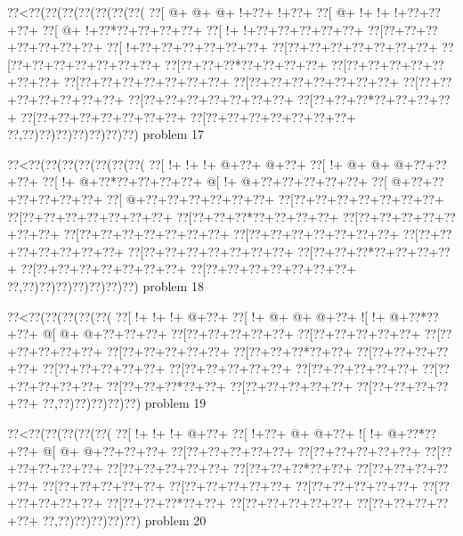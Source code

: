 \vbox{\vbox{\goo
\0??<\0??(\0??(\0??(\0??(\0??(\0??(\0??(
\0??[\- @+\- @+\- @+\- !+\0??+\- !+\0??+
\0??[\- @+\- !+\- !+\- !+\0??+\0??+\0??+
\0??[\- @+\- !+\0??*\0??+\0??+\0??+\0??+
\0??[\- !+\- !+\0??+\0??+\0??+\0??+\0??+
\0??[\0??+\0??+\0??+\0??+\0??+\0??+\0??+
\0??[\- !+\0??+\0??+\0??+\0??+\0??+\0??+
\0??[\0??+\0??+\0??+\0??+\0??+\0??+\0??+
\0??[\0??+\0??+\0??+\0??+\0??+\0??+\0??+
\0??[\0??+\0??+\0??*\0??+\0??+\0??+\0??+
\0??[\0??+\0??+\0??+\0??+\0??+\0??+\0??+
\0??[\0??+\0??+\0??+\0??+\0??+\0??+\0??+
\0??[\0??+\0??+\0??+\0??+\0??+\0??+\0??+
\0??[\0??+\0??+\0??+\0??+\0??+\0??+\0??+
\0??[\0??+\0??+\0??+\0??+\0??+\0??+\0??+
\0??[\0??+\0??+\0??*\0??+\0??+\0??+\0??+
\0??[\0??+\0??+\0??+\0??+\0??+\0??+\0??+
\0??[\0??+\0??+\0??+\0??+\0??+\0??+\0??+
\0??,\0??)\0??)\0??)\0??)\0??)\0??)\0??)
}
\hfil problem 17\hfil\break
}

\vbox{\vbox{\goo
\0??<\0??(\0??(\0??(\0??(\0??(\0??(\0??(
\0??[\- !+\- !+\- !+\- @+\0??+\- @+\0??+
\0??[\- !+\- @+\- @+\- @+\0??+\0??+\0??+
\0??[\- !+\- @+\0??*\0??+\0??+\0??+\0??+
\- @[\- !+\- @+\0??+\0??+\0??+\0??+\0??+
\0??[\- @+\0??+\0??+\0??+\0??+\0??+\0??+
\0??[\- @+\0??+\0??+\0??+\0??+\0??+\0??+
\0??[\0??+\0??+\0??+\0??+\0??+\0??+\0??+
\0??[\0??+\0??+\0??+\0??+\0??+\0??+\0??+
\0??[\0??+\0??+\0??*\0??+\0??+\0??+\0??+
\0??[\0??+\0??+\0??+\0??+\0??+\0??+\0??+
\0??[\0??+\0??+\0??+\0??+\0??+\0??+\0??+
\0??[\0??+\0??+\0??+\0??+\0??+\0??+\0??+
\0??[\0??+\0??+\0??+\0??+\0??+\0??+\0??+
\0??[\0??+\0??+\0??+\0??+\0??+\0??+\0??+
\0??[\0??+\0??+\0??*\0??+\0??+\0??+\0??+
\0??[\0??+\0??+\0??+\0??+\0??+\0??+\0??+
\0??[\0??+\0??+\0??+\0??+\0??+\0??+\0??+
\0??,\0??)\0??)\0??)\0??)\0??)\0??)\0??)
}
\hfil problem 18\hfil\break
}

\vbox{\vbox{\goo
\0??<\0??(\0??(\0??(\0??(\0??(
\0??[\- !+\- !+\- !+\- @+\0??+
\0??[\- !+\- @+\- @+\- @+\0??+
\- ![\- !+\- @+\0??*\0??+\0??+
\- @[\- @+\- @+\0??+\0??+\0??+
\0??[\0??+\0??+\0??+\0??+\0??+
\0??[\0??+\0??+\0??+\0??+\0??+
\0??[\0??+\0??+\0??+\0??+\0??+
\0??[\0??+\0??+\0??+\0??+\0??+
\0??[\0??+\0??+\0??*\0??+\0??+
\0??[\0??+\0??+\0??+\0??+\0??+
\0??[\0??+\0??+\0??+\0??+\0??+
\0??[\0??+\0??+\0??+\0??+\0??+
\0??[\0??+\0??+\0??+\0??+\0??+
\0??[\0??+\0??+\0??+\0??+\0??+
\0??[\0??+\0??+\0??*\0??+\0??+
\0??[\0??+\0??+\0??+\0??+\0??+
\0??[\0??+\0??+\0??+\0??+\0??+
\0??,\0??)\0??)\0??)\0??)\0??)
}
\hfil problem 19\hfil\break
}

\vbox{\vbox{\goo
\0??<\0??(\0??(\0??(\0??(\0??(
\0??[\- !+\- !+\- !+\- @+\0??+
\0??[\- !+\0??+\- @+\- @+\0??+
\- ![\- !+\- @+\0??*\0??+\0??+
\- @[\- @+\- @+\0??+\0??+\0??+
\0??[\0??+\0??+\0??+\0??+\0??+
\0??[\0??+\0??+\0??+\0??+\0??+
\0??[\0??+\0??+\0??+\0??+\0??+
\0??[\0??+\0??+\0??+\0??+\0??+
\0??[\0??+\0??+\0??*\0??+\0??+
\0??[\0??+\0??+\0??+\0??+\0??+
\0??[\0??+\0??+\0??+\0??+\0??+
\0??[\0??+\0??+\0??+\0??+\0??+
\0??[\0??+\0??+\0??+\0??+\0??+
\0??[\0??+\0??+\0??+\0??+\0??+
\0??[\0??+\0??+\0??*\0??+\0??+
\0??[\0??+\0??+\0??+\0??+\0??+
\0??[\0??+\0??+\0??+\0??+\0??+
\0??,\0??)\0??)\0??)\0??)\0??)
}
\hfil problem 20\hfil\break
}

